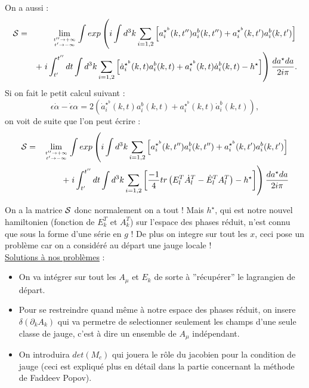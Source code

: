 \documentclass[a4paper,11pt]{article}
\theoremstyle{plain}
\theoremstyle{definition}
\theoremstyle{remark}
\numberwithin{equation}{section}
\numberwithin{equation}{subsection}
\numberwithin{figure}{section}
\begin{document}
\noindent
On a aussi :
\begin{eqnarray}
 \mathcal{S} &=& \lim_{t'' \to + \infty \atop t' \to - \infty}
\int exp \left( 
i \int d^{3}k \sum_{i=1,2} \left[ a^{\star^{b}}_{i}(k,t'') a^{b}_{i}(k,t'') + a^{\star^{b}}_{i}(k,t') a^{b}_{i}(k,t') \right] \right. \nonumber \\ 
&& + \left. i \int^{t''}_{t'} dt \int d^{3}k 
\sum_{i=1,2} \left[ \dot{a}^{\star^{b}}_{i}(k,t) a^{b}_{i}(k,t) + a^{\star^{b}}_{i}(k,t) \dot{a}^{b}_{i}(k,t) - h^{\star} \right]
\right) \frac{da^{\star} da}{2i \pi}. \nonumber  \\
\end{eqnarray}
Si on fait le petit calcul suivant :
\begin{equation}
 \epsilon \dot{\alpha} - \dot{\epsilon} \alpha = 2 \left(\dot{a}^{\star^{b}}_{i}(k,t) a^{b}_{i}(k,t) 
+ a^{\star^{b}}_{i}(k,t) \dot{a}^{b}_{i}(k,t) \right),
\end{equation}
on voit de suite que l'on peut écrire :
\begin{eqnarray}
 \mathcal{S} &=& \lim_{t'' \to + \infty \atop t' \to - \infty}
\int exp \left( 
i \int d^{3}k \sum_{i=1,2} \left[ a^{\star^{b}}_{i}(k,t'') a^{b}_{i}(k,t'') + a^{\star^{b}}_{i}(k,t') a^{b}_{i}(k,t') \right] \right. \nonumber  \\ 
&& + \left. i \int^{t''}_{t'} dt \int d^{3}k 
\sum_{i=1,2} \left[ \frac{-1}{4} tr\left(E^{T}_{l} \dot{A}^{T}_{l} - \dot{E}^{T}_{l} A^{T}_{l} \right)  - h^{\star} \right]
\right) \frac{da^{\star} da}{2i \pi}
\end{eqnarray}

\noindent
On a la matrice $\cal{S}$ donc normalement on a tout ! Mais $h^{\star}$, qui est notre nouvel hamiltonien (fonction de $E^{T}_{k}$ et $A^{T}_{k}$) 
sur l'espace des phases réduit, n'est connu que sous la forme d'une série en $g$ ! De plus on integre sur tout les $x$, ceci pose un problème car 
on a considéré au départ une jauge locale !\\

\noindent
\underline{Solutions à nos problèmes} :\\
\begin{itemize}
 \item On va intégrer sur tout les $A_{\mu}$ et $E_{k}$ de sorte à ''récupérer'' le lagrangien de départ.
 \item Pour se restreindre quand même à notre espace des phases réduit, on insere $\delta \left( \partial_{k} A_{k} \right)$ qui va permetre 
de selectionner seulement les champs d'une seule classe de jauge, c'est à dire un ensemble de $A_{\mu}$ indépendant.
 \item On introduira $det(M_{c})$ qui jouera le rôle du jacobien pour la condition de jauge (ceci est expliqué plus en détail dans la partie concernant
la méthode de Faddeev Popov).
\end{itemize}
\end{document}
